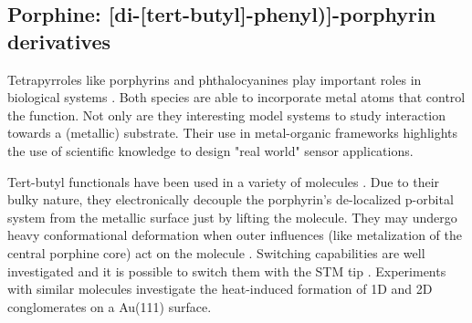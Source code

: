 %


\subsection{Porphine: [di-[tert-butyl]-phenyl)]-porphyrin derivatives}
\label{sec:TBP}
Tetrapyrroles like porphyrins and phthalocyanines play important roles in biological systems \cite{battersby_tetrapyrroles_2000}. Both species are able to incorporate metal atoms that control the function. Not only are they interesting model systems to study interaction towards a (metallic) substrate\cite{auwarter_porphyrins_2015, auwarter_controlled_2007, diller_vacuo_2016}. Their use in metal-organic frameworks highlights the use of scientific knowledge to design "real world" sensor applications\cite{Lustig_Metal-organic_2017}. 


Tert-butyl functionals have been used in a variety of molecules \cite{moresco_conformational_2001}. Due to their bulky nature, they electronically decouple the porphyrin’s de-localized p-orbital system from the metallic surface just by lifting the molecule. They may undergo heavy conformational deformation when outer influences (like metalization of the central porphine core) act on the molecule \cite{stark_massive_2014}. Switching capabilities are well investigated \cite{loppacher_direct_2003} and it is possible to switch them with the STM tip \cite{ditze_energetics_2014}. Experiments with similar molecules investigate the heat-induced formation of 1D and 2D conglomerates on a Au(111) surface.\cite{pham_heat-induced_2015}

